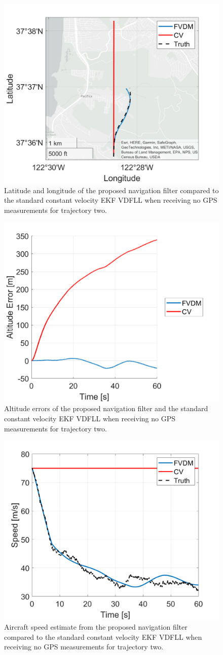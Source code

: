 \documentclass[12pt]{report}
\begin{document}
\begin{figure}[!ht]
  \centering
  \includegraphics[width=0.6\linewidth]{Figures/NOGPS/GEOPLOT.png}
  \caption{Latitude and longitude of the proposed navigation filter compared to the standard constant velocity EKF VDFLL when receiving no GPS measurements for trajectory two.}\label{fig:NOGPSGEOPLOT}
\end{figure}


\begin{figure}[!ht]
  \centering
  \includegraphics[width=0.6\linewidth]{Figures/NOGPS/ALT.png}
  \caption{Altitude errors of the proposed navigation filter and the standard constant velocity EKF VDFLL when receiving no GPS measurements for trajectory two.}\label{fig:NOGPSALT}
\end{figure}

\begin{figure}[!ht]
  \centering
  \includegraphics[width=0.6\linewidth]{Figures/NOGPS/SPEED.png}
  \caption{Aircraft speed estimate from the proposed navigation filter compared to the standard constant velocity EKF VDFLL when receiving no GPS measurements for trajectory two.}\label{fig:NOGPSSPEED}
\end{figure}
\end{document}
